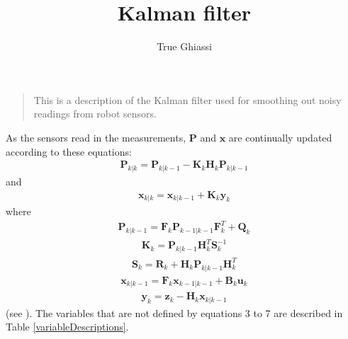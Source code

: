 \documentclass{article}
\title{Kalman filter}
\author{True Ghiassi}
\begin{document}
\maketitle
\begin{quote}
This is a description of the Kalman filter used for smoothing out noisy readings from robot sensors.
\end{quote}
As the sensors read in the measurements, $\bm P$ and $\bm x$ are continually updated according to these equations: 
\begin{align}
\bm P_{k|k} = \bm P_{k|k-1} - \bm K_k \bm H_k \bm P_{k|k-1}
\end{align}
and
\begin{align}
\bm x_{k|k} = \bm x_{k|k-1}+\bm K_k\bm y_k
\end{align}
where
\begin{align}
  \bm P_{k|k-1} = \bm F_k \bm P_{k-1|k-1}\bm F_k^T+\bm Q_k
\end{align}
\begin{align}
  \bm K_k=\bm P_{k|k-1} \bm H_k^T\bm S_k^{-1}
\end{align}
\begin{align}
  \bm S_k=\bm R_k+\bm H_k\bm P_{k|k-1}\bm H_k^T
\end{align}
\begin{align}
  \bm x_{k|k-1} = \bm F_k \bm x_{k-1|k-1} + \bm B_k\bm u_k
\end{align}
\begin{align}
  \bm y_{k} = \bm z_k - \bm H_k\bm x_{k|k-1}
\end{align}
(see \cite{wpKalman}).  The variables that are not defined by equations 3 to 7 are described in Table \ref{variableDescriptions}.
\end{document}
